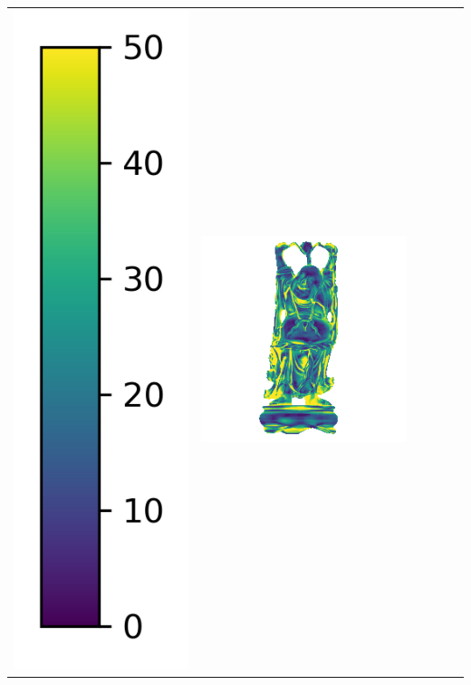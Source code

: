 \begin{tabularx}{\linewidth}{@{}Y@{}Y@{}Y@{}Y@{}Y@{}Y@{}}
\includegraphics[width=0.2\linewidth]{semisynthetic/colorbar_error_vertical.png} &
\includegraphics[width=\linewidth]{semisynthetic/20150514_20_ours_err.png} &

\end{tabularx}
